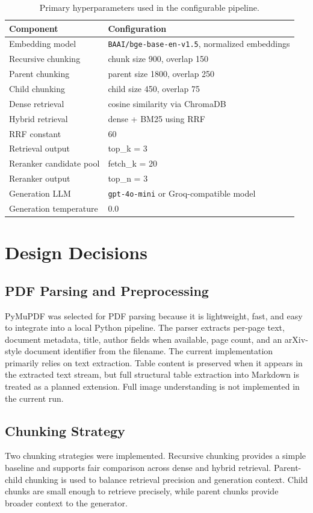 \documentclass[11pt]{article}
\newcommand{\code}[1]{\texttt{#1}}
\begin{document}
\begin{table}[H]
\centering
\small
\begin{tabular}{ll}
\toprule
Component & Configuration \\
\midrule
Embedding model & \code{BAAI/bge-base-en-v1.5}, normalized embeddings \\
Recursive chunking & chunk size 900, overlap 150 \\
Parent chunking & parent size 1800, overlap 250 \\
Child chunking & child size 450, overlap 75 \\
Dense retrieval & cosine similarity via ChromaDB \\
Hybrid retrieval & dense + BM25 using RRF \\
RRF constant & 60 \\
Retrieval output & top\_k = 3 \\
Reranker candidate pool & fetch\_k = 20 \\
Reranker output & top\_n = 3 \\
Generation LLM & \code{gpt-4o-mini} or Groq-compatible model \\
Generation temperature & 0.0 \\
\bottomrule
\end{tabular}
\caption{Primary hyperparameters used in the configurable pipeline.}
\end{table}

\section{Design Decisions}

\subsection{PDF Parsing and Preprocessing}
PyMuPDF was selected for PDF parsing because it is lightweight, fast, and easy to integrate into a local Python pipeline. The parser extracts per-page text, document metadata, title, author fields when available, page count, and an arXiv-style document identifier from the filename. The current implementation primarily relies on text extraction. Table content is preserved when it appears in the extracted text stream, but full structural table extraction into Markdown is treated as a planned extension. Full image understanding is not implemented in the current run.

\subsection{Chunking Strategy}
Two chunking strategies were implemented. Recursive chunking provides a simple baseline and supports fair comparison across dense and hybrid retrieval. Parent-child chunking is used to balance retrieval precision and generation context. Child chunks are small enough to retrieve precisely, while parent chunks provide broader context to the generator.
\end{document}
